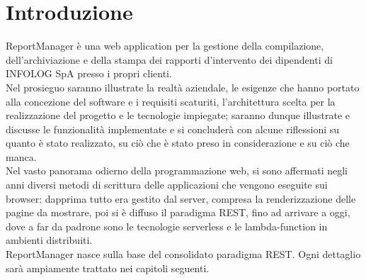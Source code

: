 \chapter{Introduzione}\label{c:introduction}

ReportManager è una web application per la gestione della compilazione, dell'archiviazione e della stampa
dei rapporti d'intervento dei dipendenti di INFOLOG SpA presso i propri clienti.
\\
Nel prosieguo saranno illustrate la realtà aziendale, le esigenze che hanno portato alla concezione
del software e i requisiti scaturiti, l'architettura scelta per la realizzazione del progetto e le tecnologie
impiegate; saranno dunque illustrate e discusse le funzionalità implementate e si concluderà con alcune riflessioni
su quanto è stato realizzato, su ciò che è stato preso in considerazione e su ciò che manca.
\\
Nel vasto panorama odierno della programmazione web, si sono affermati negli anni diversi metodi di scrittura
delle applicazioni che vengono eseguite sui browser: dapprima tutto era gestito dal server, compresa la renderizzazione
delle pagine da mostrare, poi si è diffuso il paradigma REST, fino ad arrivare a oggi, dove a far da padrone sono
le tecnologie serverless e le lambda-function in ambienti distribuiti.
\\
ReportManager nasce sulla base del consolidato paradigma REST. Ogni dettaglio sarà ampiamente trattato nei
capitoli seguenti.
